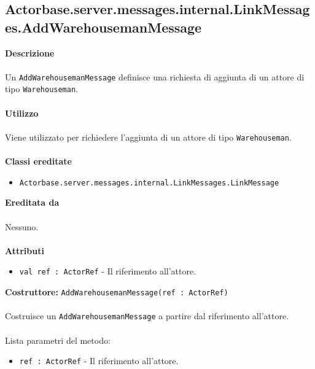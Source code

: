 \documentclass[a4paper]{article}
\begin{document}
	\subsection{Actorbase.server.messages.internal.LinkMessages.AddWarehousemanMessage}
		\textbf{Descrizione}
			\\ \\
			Un \texttt{AddWarehousemanMessage} definisce una richiesta di aggiunta di un attore di tipo \texttt{Warehouseman}.
			\\ \\
		\textbf{Utilizzo}
			\\ \\
			Viene utilizzato per richiedere l'aggiunta di un attore di tipo \texttt{Warehouseman}.
			\\ \\
		\textbf{Classi ereditate}
			\begin{itemize}
				\item \texttt{Actorbase.server.messages.internal.LinkMessages.LinkMessage}
			\end{itemize}
		\textbf{Ereditata da}
			\\ \\
			Nessuno.
			\\ \\
		\textbf{Attributi}
			\begin{itemize}
				\item \texttt{val ref : ActorRef} - Il riferimento all'attore.
			\end{itemize}
		\textbf{Costruttore:} \texttt{AddWarehousemanMessage(ref : ActorRef)}
		\\ \\
		Costruisce un \texttt{AddWarehousemanMessage} a partire dal riferimento all'attore.
		\\ \\
		Lista parametri del metodo:
			\begin{itemize}
				\item \texttt{ref : ActorRef} - Il riferimento all'attore.
			\end{itemize}
			
\end{document}
